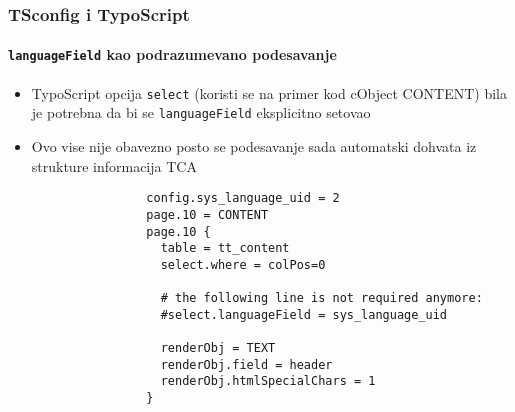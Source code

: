 \begin{frame}[fragile]
	\frametitle{TSconfig i TypoScript}
	\framesubtitle{\texttt{languageField} kao podrazumevano podesavanje}

	\lstset{basicstyle=\tiny\ttfamily}

	\begin{itemize}

		\item TypoScript opcija \texttt{select} (koristi se na primer kod cObject CONTENT) bila je potrebna da bi se \texttt{languageField} eksplicitno setovao

		\item Ovo vise nije obavezno posto se podesavanje sada automatski dohvata iz strukture informacija TCA


			\begin{lstlisting}
				config.sys_language_uid = 2
				page.10 = CONTENT
				page.10 {
				  table = tt_content
				  select.where = colPos=0

				  # the following line is not required anymore:
				  #select.languageField = sys_language_uid

				  renderObj = TEXT
				  renderObj.field = header
				  renderObj.htmlSpecialChars = 1
				}
			\end{lstlisting}

	\end{itemize}

\end{frame}

